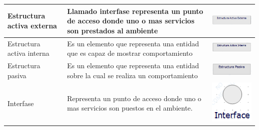 \begin{table}[h!]
\begin{tabular}{| m{7em} | m{7cm} | m{3cm} |}
		\hline
		Estructura activa externa  
		& 
		Llamado interfase representa un punto de acceso donde uno o mas servicios son prestados al ambiente  
		&\includegraphics[width=0.8\linewidth, height=0.05\textheight]{imgs/conceptos/meta/EstructuraActivaExterna}
		\\
		
		\hline
		Estructura activa interna
		& 
		Es un elemento que representa una entidad que es capaz de mostrar comportamiento
		& \includegraphics[width=0.8\linewidth, height=0.05\textheight]{imgs/conceptos/meta/EstructuraActivaInterna.PNG}
		\\
		
		\hline
		Estructura pasiva
		& 
		Es un elemento que representa una entidad sobre la cual se realiza un comportamiento
		& \includegraphics[width=0.8\linewidth, height=0.05\textheight]{imgs/conceptos/meta/EstructuraPasiva.PNG}
		\\
		
		\hline
		Interfase
		& 
		Representa un punto de acceso donde uno o mas servicios son puestos en el ambiente.
		& \includegraphics[width=0.8\linewidth, height=0.05\textheight]{imgs/conceptos/meta/Interface.PNG}
		\\
		

\end{tabular}
\end{table}
